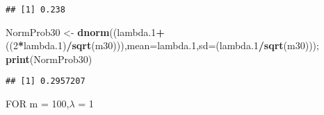 \documentclass[
]{article}
\newenvironment{Shaded}{\begin{snugshade}}{\end{snugshade}}
\newcommand{\DataTypeTok}[1]{\textcolor[rgb]{0.13,0.29,0.53}{#1}}
\newcommand{\DecValTok}[1]{\textcolor[rgb]{0.00,0.00,0.81}{#1}}
\newcommand{\FloatTok}[1]{\textcolor[rgb]{0.00,0.00,0.81}{#1}}
\newcommand{\KeywordTok}[1]{\textcolor[rgb]{0.13,0.29,0.53}{\textbf{#1}}}
\newcommand{\NormalTok}[1]{#1}
\newcommand{\OperatorTok}[1]{\textcolor[rgb]{0.81,0.36,0.00}{\textbf{#1}}}
\newcommand{\StringTok}[1]{\textcolor[rgb]{0.31,0.60,0.02}{#1}}
\begin{document}
\begin{verbatim}
## [1] 0.238
\end{verbatim}

\begin{Shaded}
\begin{Highlighting}[]
\NormalTok{NormProb30 <-}\StringTok{ }\KeywordTok{dnorm}\NormalTok{((lambda}\FloatTok{.1}\OperatorTok{+}\NormalTok{((}\DecValTok{2}\OperatorTok{*}\NormalTok{lambda}\FloatTok{.1}\NormalTok{)}\OperatorTok{/}\KeywordTok{sqrt}\NormalTok{(m30))),}\DataTypeTok{mean=}\NormalTok{lambda}\FloatTok{.1}\NormalTok{,}\DataTypeTok{sd=}\NormalTok{(lambda}\FloatTok{.1}\OperatorTok{/}\KeywordTok{sqrt}\NormalTok{(m30))); }\KeywordTok{print}\NormalTok{(NormProb30)}
\end{Highlighting}
\end{Shaded}

\begin{verbatim}
## [1] 0.2957207
\end{verbatim}

FOR m = 100,\(\lambda\) = 1
\end{document}
